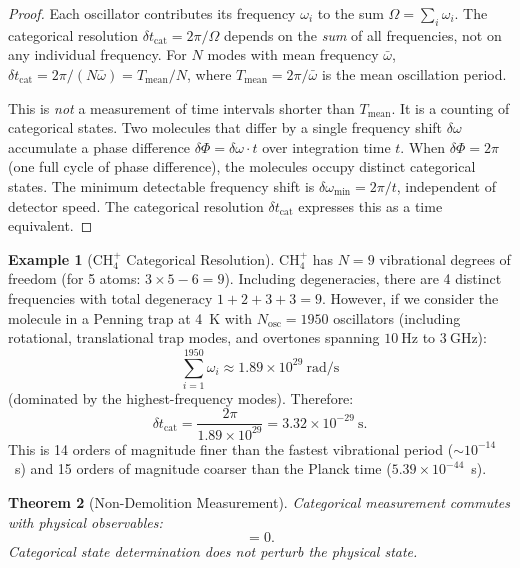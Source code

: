 \documentclass[11pt,twocolumn,a4paper]{article}
\newtheorem{theorem}{Theorem}[section]
\theoremstyle{definition}
\newtheorem{example}[theorem]{Example}
\theoremstyle{remark}
\newcommand{\Ocat}{\hat{O}_{\mathrm{cat}}}
\newcommand{\Ophys}{\hat{O}_{\mathrm{phys}}}
\begin{document}
\begin{proof}
Each oscillator contributes its frequency $\omega_i$ to the sum $\Omega = \sum_i \omega_i$. The categorical resolution $\delta t_{\mathrm{cat}} = 2\pi/\Omega$ depends on the \emph{sum} of all frequencies, not on any individual frequency. For $N$ modes with mean frequency $\bar{\omega}$, $\delta t_{\mathrm{cat}} = 2\pi/(N\bar{\omega}) = T_{\mathrm{mean}}/N$, where $T_{\mathrm{mean}} = 2\pi/\bar{\omega}$ is the mean oscillation period.

This is \emph{not} a measurement of time intervals shorter than $T_{\mathrm{mean}}$. It is a counting of categorical states. Two molecules that differ by a single frequency shift $\delta\omega$ accumulate a phase difference $\delta\Phi = \delta\omega \cdot t$ over integration time $t$. When $\delta\Phi = 2\pi$ (one full cycle of phase difference), the molecules occupy distinct categorical states. The minimum detectable frequency shift is $\delta\omega_{\min} = 2\pi/t$, independent of detector speed. The categorical resolution $\delta t_{\mathrm{cat}}$ expresses this as a time equivalent.
\end{proof}

\begin{example}[CH$_4^+$ Categorical Resolution]
\label{ex:ch4_temporal}
CH$_4^+$ has $N = 9$ vibrational degrees of freedom (for 5 atoms: $3 \times 5 - 6 = 9$). Including degeneracies, there are 4 distinct frequencies with total degeneracy $1 + 2 + 3 + 3 = 9$. However, if we consider the molecule in a Penning trap at 4~K with $N_{\mathrm{osc}} = 1950$ oscillators (including rotational, translational trap modes, and overtones spanning $10~\mathrm{Hz}$ to $3~\mathrm{GHz}$):
\begin{equation}
\sum_{i=1}^{1950} \omega_i \approx 1.89 \times 10^{29}~\mathrm{rad/s}
\end{equation}
(dominated by the highest-frequency modes). Therefore:
\begin{equation}
\delta t_{\mathrm{cat}} = \frac{2\pi}{1.89 \times 10^{29}} = 3.32 \times 10^{-29}~\mathrm{s}.
\end{equation}
This is 14 orders of magnitude finer than the fastest vibrational period ($\sim 10^{-14}$~s) and 15 orders of magnitude coarser than the Planck time ($5.39 \times 10^{-44}$~s).
\end{example}

\begin{theorem}[Non-Demolition Measurement]
\label{thm:nondemolition}
Categorical measurement commutes with physical observables:
\begin{equation}
[\Ocat, \Ophys] = 0.
\end{equation}
Categorical state determination does not perturb the physical state.
\end{theorem}
\end{document}
